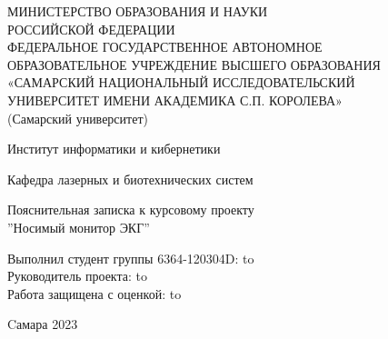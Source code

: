 \begin{titlepage}
\newpage
\begin{doublespace}
\begin{center}
МИНИСТЕРСТВО ОБРАЗОВАНИЯ И НАУКИ \\
РОССИЙСКОЙ ФЕДЕРАЦИИ\\
ФЕДЕРАЛЬНОЕ ГОСУДАРСТВЕННОЕ АВТОНОМНОЕ\\
ОБРАЗОВАТЕЛЬНОЕ УЧРЕЖДЕНИЕ ВЫСШЕГО ОБРАЗОВАНИЯ\\
«САМАРСКИЙ НАЦИОНАЛЬНЫЙ ИССЛЕДОВАТЕЛЬСКИЙ\\
УНИВЕРСИТЕТ ИМЕНИ АКАДЕМИКА С.П. КОРОЛЕВА»	\\
(Самарский университет) \\
\end{center}

\vspace{4em}

\begin{center}
Институт информатики и кибернетики \\ 
\end{center}

\begin{center}
Кафедра лазерных и биотехнических систем \\ 
\end{center}


\vspace{3em}

\begin{center}
{Пояснительная записка к курсовому проекту\\''Носимый монитор ЭКГ''}
\end{center}

\vspace{11em}




\newbox{\lbox}
\newlength{\maxl}
\setlength{\maxl}{\wd\lbox}
\hfill\parbox{15cm}{
\hspace*{5cm}\hspace*{-5cm}Выполнил студент группы 6364-120304D:\hfill\underline{\hspace{4em}}  \hbox to\\
\hspace*{5cm}\hspace*{-5cm}Руководитель проекта:\hfill\underline{\hspace{4em}}  \hbox to\\
\hspace*{5cm}\hspace*{-5cm}Работа защищена с оценкой:\hfill\underline{\hspace{4em}}  \hbox to\maxl{ \hfill }\\
}


\vspace{\fill}

\begin{center}Cамара 2023\end{center}

\end{doublespace}
\end{titlepage}
\setcounter{page}{2}